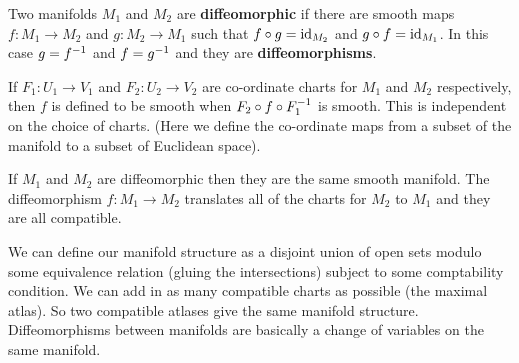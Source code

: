 \begin{defn}
  Two manifolds $M_1$ and $M_2$ are \textbf{diffeomorphic} if there are smooth maps $f: M_1 \to M_2$ and $g: M_2 \to M_1$ such that $f \circ g = \operatorname{id}_{M_2}$ and $g \circ f = \operatorname{id}_{M_1}$.
  In this case $g=f^{-1}$ and $f=g^{-1}$ and they are \textbf{diffeomorphisms}.
\end{defn}

\begin{rmk}
  If $F_1: U_1 \to V_1$ and $F_2: U_2 \to V_2$ are co-ordinate charts for $M_1$ and $M_2$ respectively, then $f$ is defined to be smooth when $F_2 \circ f \circ F_1^{-1}$ is smooth.
  This is independent on the choice of charts.
  (Here we define the co-ordinate maps from a subset of the manifold to a subset of Euclidean space).
\end{rmk}

\begin{rmk}
  If $M_1$ and $M_2$ are diffeomorphic then they are the same smooth manifold.
  The diffeomorphism $f: M_1 \to M_2$ translates all of the charts for $M_2$ to $M_1$ and they are all compatible.
\end{rmk}

\begin{rmk}[Gluing]
  We can define our manifold structure as a disjoint union of open sets modulo some equivalence relation (gluing the intersections) subject to some comptability condition.
  We can add in as many compatible charts as possible (the maximal atlas).
  So two compatible atlases give the same manifold structure.
  Diffeomorphisms between manifolds are basically a change of variables on the same manifold.
\end{rmk}
